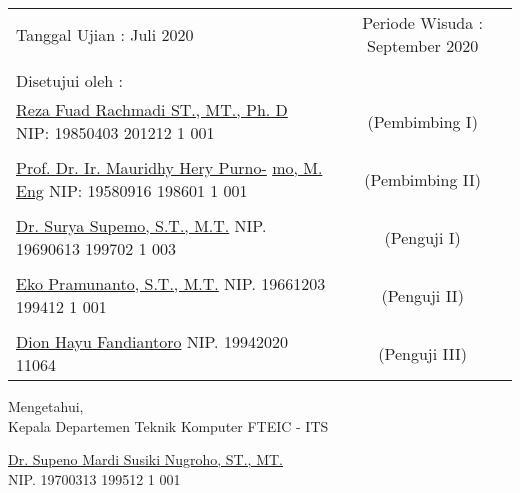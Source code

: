 \noindent
\begin{tabularx}{\textwidth}{X c}
  Tanggal Ujian : Juli 2020                                                    & Periode Wisuda : September 2020 \\
                                                                               &                                 \\
  Disetujui oleh :                                                             &                                 \\
  \underline{Reza Fuad Rachmadi ST., MT., Ph. D} \newline
  NIP: 19850403 201212 1 001                                                   & (Pembimbing I)                  \\ \\
  \underline{Prof. Dr. Ir. Mauridhy Hery Purno-} \newline \underline{mo, M. Eng} \newline NIP: 19580916 198601 1 001
                                                                               & (Pembimbing II)                 \\ \\
  \underline{Dr. Surya Supemo, S.T., M.T.} \newline NIP. 19690613 199702 1 003 & (Penguji I)                     \\ \\

  \underline{Eko Pramunanto, S.T., M.T.} \newline NIP. 19661203 199412 1 001   & (Penguji II)                    \\ \\

  \underline{Dion Hayu Fandiantoro} \newline NIP. 19942020 11064               & (Penguji III)                   \\
\end{tabularx}
\endgroup

\begin{center}
  Mengetahui, \\
  Kepala Departemen Teknik Komputer FTEIC - ITS \\

  \vspace{7ex}

  \underline{Dr. Supeno Mardi Susiki Nugroho, ST., MT.} \\
  NIP. 19700313 199512 1 001
\end{center}
\endgroup

